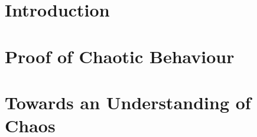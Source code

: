 \documentclass[9pt, a4paper]{report}
\begin{document}
\lstset{style=mystylePython}



\tableofcontents
\clearpage

\chapter{Introduction}

\clearpage

\chapter{Proof of Chaotic Behaviour}

\clearpage

\chapter{Towards an Understanding of Chaos}
\label{section:understandingChaos}

\clearpage

%

%
%
%
%
%
%
\end{document}
